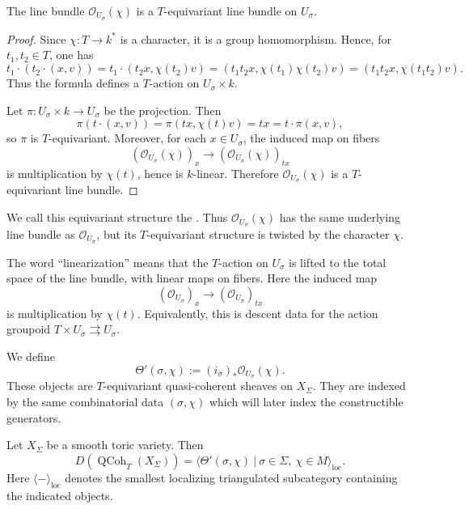 \begin{proposition}
The line bundle \(\mathcal O_{U_\sigma}(\chi)\) is a
\(T\)-equivariant line bundle on \(U_\sigma\).
\end{proposition}

\begin{proof}
Since \(\chi:T\to k^*\) is a character, it is a group homomorphism.
Hence, for \(t_1,t_2\in T\), one has
\[
t_1\cdot(t_2\cdot(x,v))
=
t_1\cdot(t_2x,\chi(t_2)v)
=
(t_1t_2x,\chi(t_1)\chi(t_2)v)
=
(t_1t_2x,\chi(t_1t_2)v).
\]
Thus the formula defines a \(T\)-action on \(U_\sigma\times k\).

Let \(\pi:U_\sigma\times k\to U_\sigma\) be the projection.  Then
\[
\pi(t\cdot(x,v))=\pi(tx,\chi(t)v)=tx=t\cdot\pi(x,v),
\]
so \(\pi\) is \(T\)-equivariant.  Moreover, for each \(x\in U_\sigma\),
the induced map on fibers
\[
(\mathcal O_{U_\sigma}(\chi))_x
\longrightarrow
(\mathcal O_{U_\sigma}(\chi))_{tx}
\]
is multiplication by \(\chi(t)\), hence is \(k\)-linear.  Therefore
\(\mathcal O_{U_\sigma}(\chi)\) is a \(T\)-equivariant line bundle.
\end{proof}

We call this equivariant structure the .  Thus \(\mathcal O_{U_\sigma}(\chi)\) has the same underlying
line bundle as \(\mathcal O_{U_\sigma}\), but its \(T\)-equivariant
structure is twisted by the character \(\chi\).

\begin{remark}
The word ``linearization'' means that the \(T\)-action on
\(U_\sigma\) is lifted to the total space of the line bundle, with linear
maps on fibers.  Here the induced map
\[
(\mathcal O_{U_\sigma})_x\longrightarrow
(\mathcal O_{U_\sigma})_{tx}
\]
is multiplication by \(\chi(t)\).  Equivalently, this is descent data for
the action groupoid \(T\times U_\sigma\rightrightarrows U_\sigma\).
\end{remark}


We define
\[
\Theta'(\sigma,\chi)
:=
(i_\sigma)_*\mathcal O_{U_\sigma}(\chi).
\]
These objects are \(T\)-equivariant quasi-coherent sheaves on \(X_\Sigma\).
They are indexed by the same combinatorial data \((\sigma,\chi)\) which
will later index the constructible generators.




\begin{theorem}\label{thm:coherent-theta-generation}
Let \(X_\Sigma\) be a smooth toric variety. Then
\[
D(\operatorname{QCoh}_T(X_\Sigma))
=
\Big\langle
\Theta'(\sigma,\chi)
\ \Big|\
\sigma\in\Sigma,\ \chi\in M
\Big\rangle_{\mathrm{loc}}.
\]
Here \(\langle - \rangle_{\mathrm{loc}}\) denotes the smallest localizing
triangulated subcategory containing the indicated objects.
\end{theorem}

